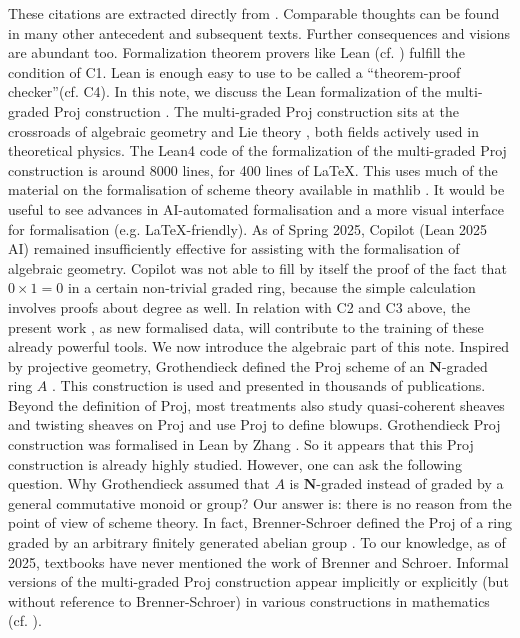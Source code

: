 \documentclass[graybox]{svmult}
\begin{document}
These citations are extracted directly from \cite{Ha61}. Comparable thoughts can be found in many other antecedent and subsequent texts. Further consequences and visions are abundant too.
Formalization theorem provers like Lean (cf. \cite{dMal15, dMU21, Av24, Bu24}) fulfill the condition of C1. Lean is enough easy to use to be called a \textquotedblleft theorem-proof checker\textquotedblright (cf. C4).  In this note, we discuss the Lean formalization of the multi-graded Proj construction \cite{MZ25}. The multi-graded Proj construction sits at the crossroads of algebraic geometry and Lie theory \cite{BS03,MR24}, both fields actively used in theoretical physics.
The Lean4 code of the formalization of the multi-graded Proj construction is around 8000 lines, for 400 lines of \LaTeX.
This uses much of the material on the formalisation of scheme theory available in mathlib \cite{Z23, Bual22, WZ22, Mathlib}.
It would be useful to see advances in AI-automated formalisation and a more visual interface for formalisation (e.g. \LaTeX-friendly).
As of Spring 2025, Copilot (Lean 2025 AI) remained insufficiently effective for assisting with the formalisation of algebraic geometry. Copilot was not able to fill by itself the proof of the fact that $0 \times 1 = 0$ in a certain non-trivial graded ring, because the simple calculation involves proofs about degree as well. In relation with C2 and C3 above, the present work \cite{MZ25}, as new formalised data, will contribute to the training of these already powerful tools.
We now introduce the algebraic part of this note. 
Inspired by projective geometry, Grothendieck defined the Proj scheme of an $\mathbf{N}$-graded ring $A$ \cite{Gr61}. This construction is used and presented in thousands of publications. 
Beyond the definition of Proj, most treatments also study quasi-coherent sheaves and twisting sheaves on Proj and use Proj to define blowups.  
Grothendieck Proj construction was formalised in Lean by Zhang \cite{Z23}. 
So it appears that this Proj construction is already highly studied.  
However, one can ask the following question. Why Grothendieck assumed that $A$ is $\mathbf{N}$-graded instead of graded by a general commutative monoid or group? 
Our answer is: there is no reason from the point of view of scheme theory. In fact, Brenner-Schroer defined the Proj of a ring graded by an arbitrary finitely generated abelian group \cite{BS03}.
To our knowledge, as of 2025, textbooks have never mentioned the work of Brenner and Schroer.
 Informal versions of the multi-graded Proj construction appear implicitly or
explicitly (but without reference to Brenner-Schroer) in various constructions in mathematics (cf. \cite{MR24}).
\end{document}
